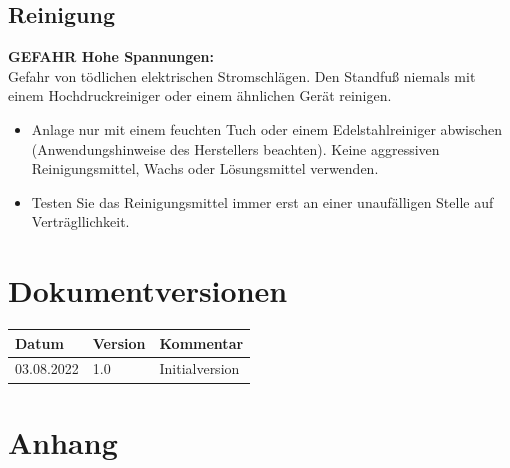 \documentclass[a4paper,10pt]{article}
\newcommand{\warn}[1]{\begin{tcolorbox}[colback=boxred,colframe=red,coltext=
white,title=Warnung]#1\end{tcolorbox}}
\begin{document}
\begin{multicols*}{2}
	\subsection{Reinigung}
	\warn{\textbf{GEFAHR Hohe Spannungen:}\\Gefahr von tödlichen elektrischen
	Stromschlägen. Den Standfuß niemals mit einem Hochdruckreiniger oder einem ähnlichen Gerät reinigen.}
	\begin{itemize}
		\item Anlage nur mit einem feuchten Tuch oder einem Edelstahlreiniger abwischen (Anwendungshinweise des Herstellers beachten). Keine aggressiven Reinigungsmittel, Wachs oder Lösungsmittel verwenden.
		\item Testen Sie das Reinigungsmittel immer erst an einer unaufälligen Stelle auf Verträgllichkeit.
	\end{itemize}

	\section{Dokumentversionen}
	\begin{tabular}{lll}
		\toprule
		Datum      & Version & Kommentar                   \\
		\midrule
		03.08.2022 & 1.0     & Initialversion              \\
		\bottomrule
	\end{tabular}

	\end{multicols*}

	\section{Anhang}
\end{document}
